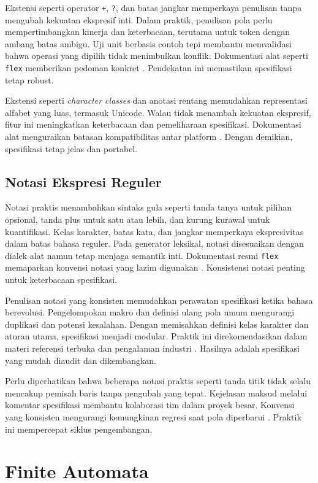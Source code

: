 \documentclass[../main.tex]{subfiles}
\begin{document}
Ekstensi seperti operator \texttt{+}, \texttt{?}, dan batas jangkar memperkaya penulisan tanpa mengubah kekuatan ekspresif inti. Dalam praktik, penulisan pola perlu mempertimbangkan kinerja dan keterbacaan, terutama untuk token dengan ambang batas ambigu. Uji unit berbasis contoh tepi membantu memvalidasi bahwa operasi yang dipilih tidak menimbulkan konflik. Dokumentasi alat seperti \texttt{flex} memberikan pedoman konkret \citep{FlexManual}. Pendekatan ini memastikan spesifikasi tetap robust.

Ekstensi seperti \emph{character classes} dan anotasi rentang memudahkan representasi alfabet yang luas, termasuk Unicode. Walau tidak menambah kekuatan ekspresif, fitur ini meningkatkan keterbacaan dan pemeliharaan spesifikasi. Dokumentasi alat menguraikan batasan kompatibilitas antar platform \citep{FlexManual}. Dengan demikian, spesifikasi tetap jelas dan portabel.

\subsection{Notasi Ekspresi Reguler}
Notasi praktis menambahkan sintaks gula seperti tanda tanya untuk pilihan opsional, tanda plus untuk satu atau lebih, dan kurung kurawal untuk kuantifikasi. Kelas karakter, batas kata, dan jangkar memperkaya ekspresivitas dalam batas bahasa reguler. Pada generator leksikal, notasi disesuaikan dengan dialek alat namun tetap menjaga semantik inti. Dokumentasi resmi \texttt{flex} memaparkan konvensi notasi yang lazim digunakan \citep{FlexManual}. Konsistensi notasi penting untuk keterbacaan spesifikasi.

Penulisan notasi yang konsisten memudahkan perawatan spesifikasi ketika bahasa berevolusi. Pengelompokan makro dan definisi ulang pola umum mengurangi duplikasi dan potensi kesalahan. Dengan memisahkan definisi kelas karakter dan aturan utama, spesifikasi menjadi modular. Praktik ini direkomendasikan dalam materi referensi terbuka dan pengalaman industri \citep{FlexManual,CS143}. Hasilnya adalah spesifikasi yang mudah diaudit dan dikembangkan.

Perlu diperhatikan bahwa beberapa notasi praktis seperti tanda titik tidak selalu mencakup pemisah baris tanpa pengubah yang tepat. Kejelasan maksud melalui komentar spesifikasi membantu kolaborasi tim dalam proyek besar. Konvensi yang konsisten mengurangi kemungkinan regresi saat pola diperbarui \citep{WikiRegex}. Praktik ini mempercepat siklus pengembangan.

\section{Finite Automata}
\end{document}

